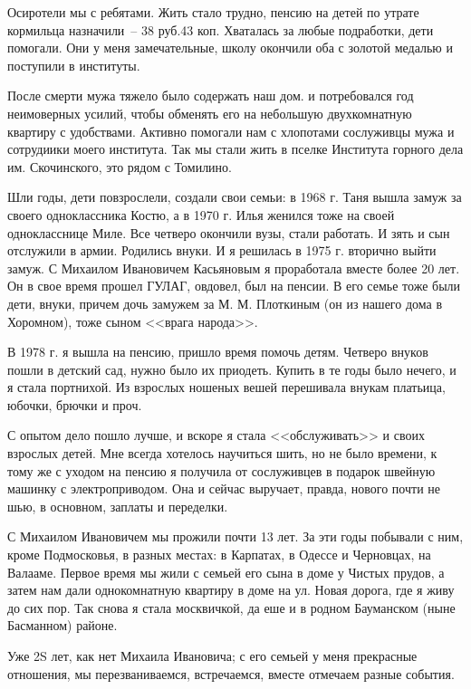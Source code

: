 Осиротели  мы  с ребятами. Жить  стало трудно, пенсию  на  детей  по  утрате 
кормильца назначили~-- 38 руб.43 коп.  Хваталась  за  любые  подработки,  дети 
помогали. Они у меня замечательные,  школу окончили  оба  с  золотой  медалью  и 
поступили в институты.

После  смерти  мужа  тяжело  было  содержать  наш  дом. и потребовался год 
неимоверных усилий, чтобы обменять его на небольшую  двухкомнатную квартиру 
с удобствами. Активно помогали нам с хлопотами сослуживцы мужа и  сотрудиики 
моего  института.  Так  мы  стали  жить  в  пселке  Института  горного дела  им. 
Скочинского, это рядом с Томилино.

Шли годы, дети повзрослели, создали свои семьи:  в 1968 г. Таня  вышла замуж 
за  своего  одноклассника  Костю,  а  в  1970 г.  Илья  женился  тоже  на  своей 
однокласснице Миле. Все  четверо окончили  вузы, стали  работать. И зять и  сын 
отслужили  в  армии. Родились внуки.  И  я решилась в 1975 г.  вторично  выйти 
замуж.  С  Михаилом  Ивановичем  Касьяновым  я  проработала  вместе  более  20 
лет. Он в свое время прошел ГУЛАГ, овдовел,  был  на  пенсии.  В его семье  тоже 
были дети, внуки, причем дочь замужем за М. М. Плоткиным  (он из нашего  дома  в 
Хоромном), тоже сыном <<врага народа>>.

В 1978 г. я вышла на пенсию,  пришло время  помочь  детям.  Четверо  внуков 
пошли в детский сад, нужно было их приодеть. Купить в те годы было нечего,  и  я 
стала  портнихой.  Из  взрослых  ношеных  вешей  перешивала  внукам  платьица, 
юбочки, брючки и проч.

С опытом  дело  пошло  лучше,  и  вскоре  я  стала  <<обслуживать>>  и  своих 
взрослых детей. Мне всегда хотелось научиться шить, но не было времени,  к тому 
же  с  уходом  на  пенсию я получила от сослуживцев в подарок швейную  машинку 
с  электроприводом.  Она  и  сейчас  выручает, правда,  нового  почти  не  шью, в 
основном, заплаты и переделки.

С  Михаилом Ивановичем мы прожили  почти  13 лет. За  эти  годы побывали с 
ним, кроме  Подмосковья,  в разных местах: в Карпатах, в Одессе и Черновцах,  на 
Валааме. Первое  время  мы  жили  с семьей  его сына  в доме  у Чистых  прудов, а 
затем  нам  дали  однокомнатную квартиру в доме на ул. Новая дорога, где  я живу 
до сих пор. Так снова я стала  москвичкой,  да еше  и  в родном  Бауманском (ныне 
Басманном) районе.

Уже 2S лет, как  нет  Михаила  Ивановича;  с  его  семьей  у  меня  прекрасные 
отношения,  мы  перезваниваемся,  встречаемся,  вместе отмечаем разные  события.

